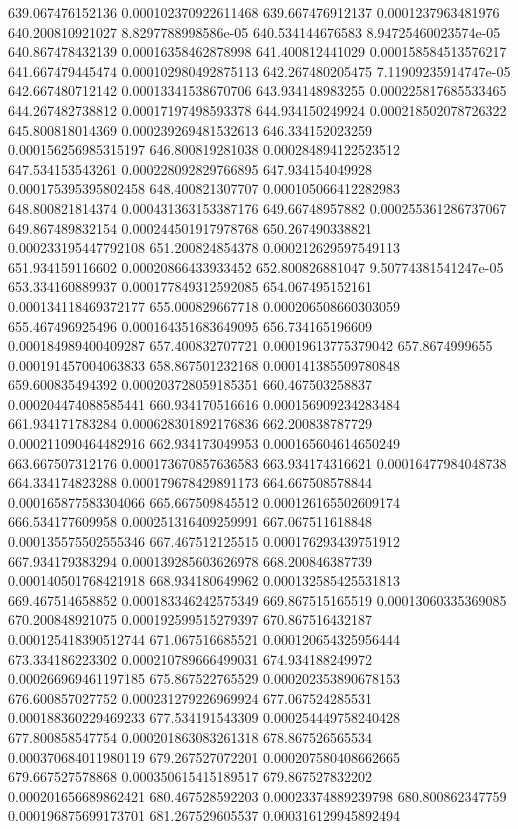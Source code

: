 {639.067476152136 0.000102370922611468
639.667476912137 0.0001237963481976
640.200810921027 8.8297788998586e-05
640.534144676583 8.94725460023574e-05
640.867478432139 0.00016358462878998
641.400812441029 0.000158584513576217
641.667479445474 0.000102980492875113
642.267480205475 7.11909235914747e-05
642.667480712142 0.00013341538670706
643.934148983255 0.000225817685533465
644.267482738812 0.00017197498593378
644.934150249924 0.000218502078726322
645.800818014369 0.000239269481532613
646.334152023259 0.000156256985315197
646.800819281038 0.000284894122523512
647.534153543261 0.000228092829766895
647.934154049928 0.000175395395802458
648.400821307707 0.000105066412282983
648.800821814374 0.000431363153387176
649.66748957882 0.000255361286737067
649.867489832154 0.000244501917978768
650.267490338821 0.000233195447792108
651.200824854378 0.000212629597549113
651.934159116602 0.00020866433933452
652.800826881047 9.50774381541247e-05
653.334160889937 0.000177849312592085
654.067495152161 0.000134118469372177
655.000829667718 0.000206508660303059
655.467496925496 0.000164351683649095
656.734165196609 0.000184989400409287
657.400832707721 0.00019613775379042
657.8674999655 0.000191457004063833
658.867501232168 0.000141385509780848
659.600835494392 0.000203728059185351
660.467503258837 0.000204474088585441
660.934170516616 0.000156909234283484
661.934171783284 0.000628301892176836
662.200838787729 0.000211090464482916
662.934173049953 0.000165604614650249
663.667507312176 0.000173670857636583
663.934174316621 0.00016477984048738
664.334174823288 0.000179678429891173
664.667508578844 0.000165877583304066
665.667509845512 0.000126165502609174
666.534177609958 0.000251316409259991
667.067511618848 0.000135575502555346
667.467512125515 0.000176293439751912
667.934179383294 0.000139285603626978
668.200846387739 0.000140501768421918
668.934180649962 0.000132585425531813
669.467514658852 0.000183346242575349
669.867515165519 0.00013060335369085
670.200848921075 0.000192599515279397
670.867516432187 0.000125418390512744
671.067516685521 0.000120654325956444
673.334186223302 0.000210789666499031
674.934188249972 0.000266969461197185
675.867522765529 0.000202353890678153
676.600857027752 0.000231279226969924
677.067524285531 0.000188360229469233
677.534191543309 0.000254449758240428
677.800858547754 0.000201863083261318
678.867526565534 0.000370684011980119
679.267527072201 0.000207580408662665
679.667527578868 0.000350615415189517
679.867527832202 0.000201656689862421
680.467528592203 0.00023374889239798
680.800862347759 0.000196875699173701
681.267529605537 0.000316129945892494
}
